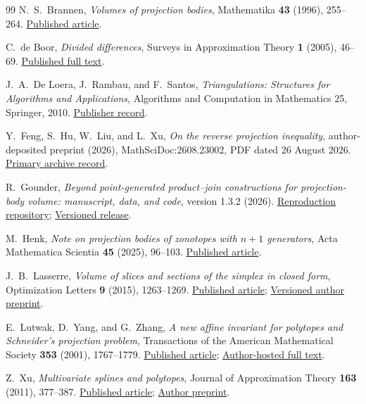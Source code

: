 \documentclass[11pt]{article}
\begin{document}
\begingroup
\small
\begin{thebibliography}{99}
N.~S.~Brannen, \emph{Volumes of projection bodies}, Mathematika
\textbf{43} (1996), 255--264.
\href{https://doi.org/10.1112/S002557930001175X}{Published article}.

C.~de Boor, \emph{Divided differences}, Surveys in Approximation Theory
\textbf{1} (2005), 46--69.
\href{https://surveys-in-approximation-theory.com/papers/2/2.pdf}{Published full text}.

J.~A.~De Loera, J.~Rambau, and F.~Santos, \emph{Triangulations: Structures
for Algorithms and Applications}, Algorithms and Computation in
Mathematics 25, Springer, 2010.
\href{https://doi.org/10.1007/978-3-642-12971-1}{Publisher record}.

Y.~Feng, S.~Hu, W.~Liu, and L.~Xu, \emph{On the reverse projection
inequality}, author-deposited preprint (2026), MathSciDoc:2608.23002,
PDF dated 26 August 2026.
\href{https://archive.ymsc.tsinghua.edu.cn/pacm_paperurl/20260821091122099811781}{Primary archive record}.

R.~Gounder, \emph{Beyond point-generated product--join constructions for
projection-body volume: manuscript, data, and code}, version 1.3.2 (2026).
\href{https://github.com/Kohze/projection-body-separation}{Reproduction repository};
\href{https://github.com/Kohze/projection-body-separation/releases/tag/v1.3.2}{Versioned release}.

M.~Henk, \emph{Note on projection bodies of zonotopes with $n+1$ generators},
Acta Mathematica Scientia \textbf{45} (2025), 96--103.
\href{https://doi.org/10.1007/s10473-025-0107-9}{Published article}.

J.~B.~Lasserre, \emph{Volume of slices and sections of the simplex in
closed form}, Optimization Letters \textbf{9} (2015), 1263--1269.
\href{https://doi.org/10.1007/s11590-015-0898-z}{Published article};
\href{https://arxiv.org/abs/1412.4617v1}{Versioned author preprint}.

E.~Lutwak, D.~Yang, and G.~Zhang, \emph{A new affine invariant for
polytopes and Schneider's projection problem}, Transactions of the
American Mathematical Society \textbf{353} (2001), 1767--1779.
\href{https://doi.org/10.1090/S0002-9947-01-02726-X}{Published article};
\href{https://cims.nyu.edu/~yangd/papers/trans.pdf}{Author-hosted full text}.

Z.~Xu, \emph{Multivariate splines and polytopes}, Journal of Approximation
Theory \textbf{163} (2011), 377--387.
\href{https://doi.org/10.1016/j.jat.2010.10.005}{Published article};
\href{https://arxiv.org/abs/0806.1127v4}{Author preprint}.


\end{thebibliography}
\end{document}
